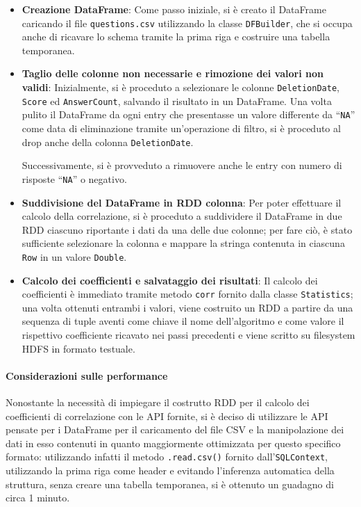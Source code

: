   \begin{itemize}
    \item
      \textbf{Creazione DataFrame}:
      Come passo iniziale, si è creato il DataFrame caricando il file \texttt{questions.csv} utilizzando la
      classe \texttt{DFBuilder}, che si occupa anche di ricavare lo schema tramite la prima riga e costruire una tabella temporanea.

    \item
      \textbf{Taglio delle colonne non necessarie e rimozione dei valori non validi}:
      Inizialmente, si è proceduto a selezionare le colonne \texttt{DeletionDate}, \texttt{Score} ed \texttt{AnswerCount}, salvando il risultato in un DataFrame.
      Una volta pulito il DataFrame da ogni entry che presentasse un valore differente da ``\texttt{NA}'' come data di eliminazione tramite un'operazione di filtro,
      si è proceduto al drop anche della colonna \texttt{DeletionDate}.

      Successivamente, si è provveduto a rimuovere anche le entry con numero di risposte ``\texttt{NA}'' o negativo.

    \item
      \textbf{Suddivisione del DataFrame in RDD colonna}:
      Per poter effettuare il calcolo della correlazione, si è proceduto a suddividere il DataFrame in due RDD ciascuno riportante i dati da una delle due colonne;
      per fare ciò, è stato sufficiente selezionare la colonna e mappare la stringa contenuta in ciascuna \texttt{Row} in un valore \texttt{Double}.

    \item
      \textbf{Calcolo dei coefficienti e salvataggio dei risultati}:
      Il calcolo dei coefficienti è immediato tramite metodo \texttt{corr} fornito dalla classe \texttt{Statistics};
      una volta ottenuti entrambi i valori, viene costruito un RDD a partire da una sequenza di tuple
      aventi come chiave il nome dell'algoritmo e come valore il rispettivo coefficiente ricavato nei passi precedenti
      e viene scritto su filesystem HDFS in formato testuale.
  \end{itemize}

  \paragraph{Considerazioni sulle performance}\label{par:job3:performance}

  Nonostante la necessità di impiegare il costrutto RDD per il calcolo dei coefficienti di correlazione con le API fornite,
  si è deciso di utilizzare le API pensate per i DataFrame per il caricamento del file CSV e la manipolazione dei dati in esso contenuti
  in quanto maggiormente ottimizzata per questo specifico formato:
  utilizzando infatti il metodo \texttt{.read.csv()} fornito dall'\texttt{SQLContext}, utilizzando la prima riga come header e evitando l'inferenza automatica della struttura, senza creare una tabella temporanea, %
  si è ottenuto un guadagno di circa 1 minuto.


